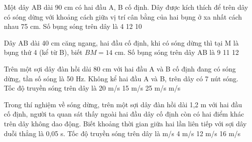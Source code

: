 \begin{ex}%
Một dây AB dài 90 cm có hai đầu A, B cố định. Dây được kích thích để trên dây có sóng dừng với khoảng cách giữa vị trí cân bằng của hai bụng ở xa nhất cách nhau 75 cm. Số bụng sóng trên dây là
\choice
{4}
{12}
{10}
{}
\end{ex} 
\begin{ex}%
Dây AB dài 40 cm căng ngang, hai đầu cố định, khi có sóng dừng thì tại M là bụng thứ 4 (kể từ B), biết $BM = 14$ cm. Số bụng sóng trên dây AB là
\choice
{9}
{}
{11}
{12}
\end{ex} 
\begin{ex}%
Trên một sợi dây đàn hồi dài 80 cm với hai đầu A và B cố định đang có sóng dừng, tần số sóng là 50 Hz. Không kể hai đầu A và B, trên dây có 7 nút sóng. Tốc độ truyền sóng trên dây là
\choice
{20 m/s}
{15 m/s}
{25 m/s}
{ m/s}
\end{ex} 
\begin{ex}%
Trong thí nghiệm về sóng dừng, trên một sợi dây đàn hồi dài 1,2 m với hai đầu cố định, người ta quan sát thấy ngoài hai đầu dây cố định còn có hai điểm khác trên dây không dao động. Biết khoảng thời gian giữa hai lần liên tiếp với sợi dây duỗi thẳng là 0,05 s. Tốc độ truyền sóng trên dây là
\choice
{ m/s}
{4 m/s}
{12 m/s}
{16 m/s}
\end{ex} 

